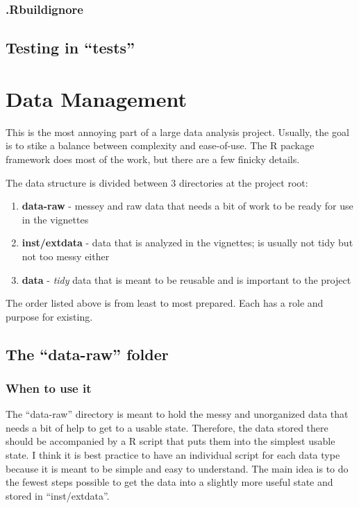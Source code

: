 \documentclass[]{book}
\providecommand{\tightlist}{%
  \setlength{\itemsep}{0pt}\setlength{\parskip}{0pt}}
\begin{document}
\hypertarget{rbuildignore}{%
\subsection{.Rbuildignore}\label{rbuildignore}}

\hypertarget{testing-in-tests}{%
\section{Testing in ``tests''}\label{testing-in-tests}}

\hypertarget{data-management}{%
\chapter{Data Management}\label{data-management}}

This is the most annoying part of a large data analysis project. Usually, the goal is to stike a balance between complexity and ease-of-use. The R package framework does most of the work, but there are a few finicky details.

The data structure is divided between 3 directories at the project root:

\begin{enumerate}
\def\labelenumi{\arabic{enumi}.}
\tightlist
\item
  \textbf{data-raw} - messey and raw data that needs a bit of work to be ready for use in the vignettes
\item
  \textbf{inst/extdata} - data that is analyzed in the vignettes; is usually not tidy but not too messy either
\item
  \textbf{data} - \emph{tidy} data that is meant to be reusable and is important to the project
\end{enumerate}

The order listed above is from least to most prepared. Each has a role and purpose for existing.

\hypertarget{the-data-raw-folder}{%
\section{The ``data-raw'' folder}\label{the-data-raw-folder}}

\hypertarget{when-to-use-it}{%
\subsection{When to use it}\label{when-to-use-it}}

The ``data-raw'' directory is meant to hold the messy and unorganized data that needs a bit of help to get to a usable state. Therefore, the data stored there should be accompanied by a R script that puts them into the simplest usable state. I think it is best practice to have an individual script for each data type because it is meant to be simple and easy to understand. The main idea is to do the fewest steps possible to get the data into a slightly more useful state and stored in ``inst/extdata''.
\end{document}
